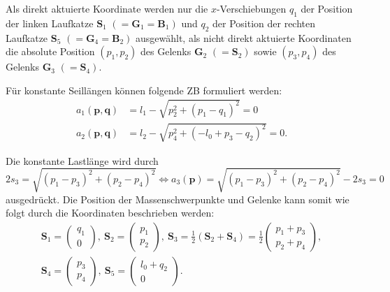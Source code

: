 Als direkt aktuierte Koordinate werden nur die $x$-Verschiebungen $q_1$ der Position der linken Laufkatze $\mathbf{S}_1$ $(= \mathbf{G}_1 = \mathbf{B}_1)$ und $q_2$ der Position der rechten Laufkatze $\mathbf{S}_5$ $(= \mathbf{G}_4 = \mathbf{B}_2)$ ausgewählt, als nicht direkt aktuierte Koordinaten die absolute Position $(p_1, p_2)$ des Gelenks $\mathbf{G}_2$ $(= \mathbf{S}_2)$ sowie $(p_3, p_4)$ des Gelenks $\mathbf{G}_3$ $(=\mathbf{S}_4)$. 

Für konstante Seillängen können folgende ZB formuliert werden:
\begin{align}
	a_1(\mathbf{p}, \mathbf{q}) &= l_{1} - \sqrt{p_{2}^{2} + \left(p_{1} - q_{1}\right)^{2}} = 0\\
	a_2(\mathbf{p}, \mathbf{q}) &= l_{2} - \sqrt{p_{4}^{2} + \left(- l_{0} + p_{3} - q_{2}\right)^{2}} = 0.	
\end{align}

Die konstante Lastlänge wird durch
\begin{equation}
	2 s_{3} = \sqrt{\left(p_{1} - p_{3}\right)^{2} + \left(p_{2} - p_{4}\right)^{2}} \Leftrightarrow a_3(\mathbf{p}) = \sqrt{\left(p_{1} - p_{3}\right)^{2} + \left(p_{2} - p_{4}\right)^{2}} - 2 s_{3} = 0
\end{equation}
ausgedrückt. Die Position der Massenschwerpunkte und Gelenke kann somit wie folgt durch die Koordinaten beschrieben werden:
\begin{align}
	\mathbf{S}_1 =
	\begin{pmatrix}
		q_1 \\
		0
	\end{pmatrix}, 
	\
	\mathbf{S}_2 =
	\begin{pmatrix}
		p_1 \\
		p_2
	\end{pmatrix},
	\
	\mathbf{S}_3 =
	\frac{1}{2}(\mathbf{S}_2 + \mathbf{S}_4) =
	\frac{1}{2}
	\begin{pmatrix}
		p_1 + p_3 \\
		p_2 + p_4
	\end{pmatrix},
	\nonumber \\
	\mathbf{S}_4 =
	\left(\begin{matrix}
		p_3 \\
		p_4
	\end{matrix}\right),
	\
	\mathbf{S}_5 =
	\left(\begin{matrix}
		l_0 + q_2 \\
		0
	\end{matrix}\right).
\end{align}

